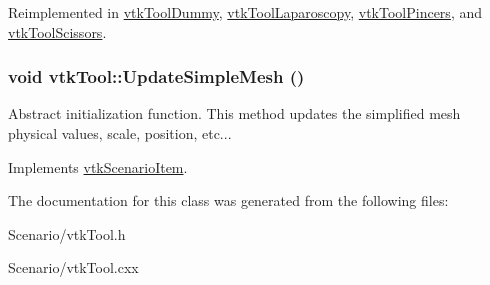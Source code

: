 Reimplemented in \hyperlink{classvtkToolDummy_a19cda726ffda0a3955e519d7b42e4882}{vtkToolDummy}, \hyperlink{classvtkToolLaparoscopy_a4445a0cfabd77b50a06929b04cb71f9e}{vtkToolLaparoscopy}, \hyperlink{classvtkToolPincers_a57986aee2bcfa04472410cd7bf5c7929}{vtkToolPincers}, and \hyperlink{classvtkToolScissors_afe574b6b9e809f746308a157b6525c4b}{vtkToolScissors}.\hypertarget{classvtkTool_ac44896d171f0512b821f7ab031f7fed7}{
\subsubsection[{UpdateSimpleMesh}]{\setlength{\rightskip}{0pt plus 5cm}void vtkTool::UpdateSimpleMesh ()}}
\label{classvtkTool_ac44896d171f0512b821f7ab031f7fed7}


Abstract initialization function. This method updates the simplified mesh physical values, scale, position, etc... 

Implements \hyperlink{classvtkScenarioItem_a75b837f36e8f79f51999dc1a7eecbe4b}{vtkScenarioItem}.

The documentation for this class was generated from the following files:\begin{DoxyCompactItemize}
\item 
Scenario/vtkTool.h\item 
Scenario/vtkTool.cxx\end{DoxyCompactItemize}

